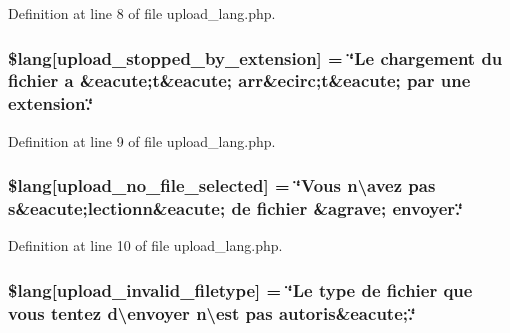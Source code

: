 Definition at line 8 of file upload\+\_\+lang.\+php.

\subsubsection[{\texorpdfstring{\$lang}{$lang}}]{\setlength{\rightskip}{0pt plus 5cm}\$lang\mbox{[}\textquotesingle{}upload\+\_\+stopped\+\_\+by\+\_\+extension\textquotesingle{}\mbox{]} = \char`\"{}Le chargement du fichier {\bf a} \&eacute;{\bf t}\&eacute; arr\&ecirc;{\bf t}\&eacute; par une extension.\char`\"{}}\hypertarget{application_2language_2french_2upload__lang_8php_ae97257deea3dddb33be4bbc6510a464b}{}\label{application_2language_2french_2upload__lang_8php_ae97257deea3dddb33be4bbc6510a464b}


Definition at line 9 of file upload\+\_\+lang.\+php.

\subsubsection[{\texorpdfstring{\$lang}{$lang}}]{\setlength{\rightskip}{0pt plus 5cm}\$lang\mbox{[}\textquotesingle{}upload\+\_\+no\+\_\+file\+\_\+selected\textquotesingle{}\mbox{]} = \char`\"{}Vous n\textbackslash{}\textquotesingle{}avez pas {\bf s}\&eacute;lectionn\&eacute; de fichier \&agrave; envoyer.\char`\"{}}\hypertarget{application_2language_2french_2upload__lang_8php_a88d8e8f9b879d1c25e6c089f3d3b5a30}{}\label{application_2language_2french_2upload__lang_8php_a88d8e8f9b879d1c25e6c089f3d3b5a30}


Definition at line 10 of file upload\+\_\+lang.\+php.

\subsubsection[{\texorpdfstring{\$lang}{$lang}}]{\setlength{\rightskip}{0pt plus 5cm}\$lang\mbox{[}\textquotesingle{}upload\+\_\+invalid\+\_\+filetype\textquotesingle{}\mbox{]} = \char`\"{}Le {\bf type} de fichier que vous tentez d\textbackslash{}\textquotesingle{}envoyer n\textbackslash{}\textquotesingle{}est pas autoris\&eacute;.\char`\"{}}\hypertarget{application_2language_2french_2upload__lang_8php_ac8631aa85ed80396bd78e91a76d5fd38}{}\label{application_2language_2french_2upload__lang_8php_ac8631aa85ed80396bd78e91a76d5fd38}


